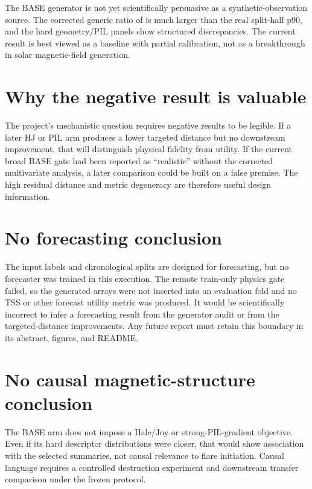 \documentclass[11pt,oneside]{report}
\begin{document}
The BASE generator is not yet scientifically persuasive as a synthetic-observation source. The corrected generic ratio of \AuditDistanceRatio{} is much larger than the real split-half p90, and the hard geometry/PIL panels show structured discrepancies. The current result is best viewed as a baseline with partial calibration, not as a breakthrough in solar magnetic-field generation.

\section{Why the negative result is valuable}

The project’s mechanistic question requires negative results to be legible. If a later HJ or PIL arm produces a lower targeted distance but no downstream improvement, that will distinguish physical fidelity from utility. If the current broad BASE gate had been reported as ``realistic'' without the corrected multivariate analysis, a later comparison could be built on a false premise. The high residual distance and metric degeneracy are therefore useful design information.

\section{No forecasting conclusion}

The input labels and chronological splits are designed for forecasting, but no forecaster was trained in this execution. The remote train-only physics gate failed, so the generated arrays were not inserted into an evaluation fold and no TSS or other forecast utility metric was produced. It would be scientifically incorrect to infer a forecasting result from the generator audit or from the targeted-distance improvements. Any future report must retain this boundary in its abstract, figures, and README.

\section{No causal magnetic-structure conclusion}

The BASE arm does not impose a Hale/Joy or strong-PIL-gradient objective. Even if its hard descriptor distributions were closer, that would show association with the selected summaries, not causal relevance to flare initiation. Causal language requires a controlled destruction experiment and downstream transfer comparison under the frozen protocol.
\end{document}
